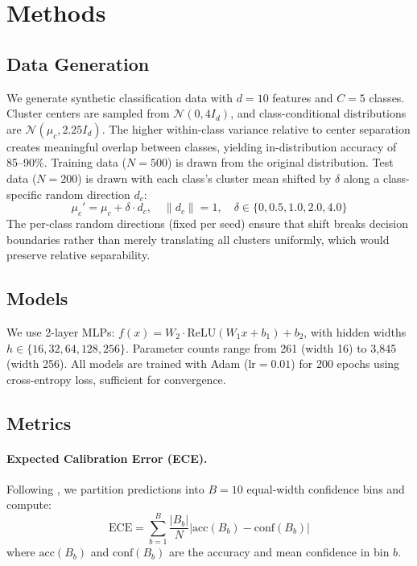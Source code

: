 \documentclass[11pt,a4paper]{article}
\begin{document}
\section{Methods}

\subsection{Data Generation}

We generate synthetic classification data with $d=10$ features and $C=5$ classes.
Cluster centers are sampled from $\mathcal{N}(0, 4I_d)$, and class-conditional distributions are $\mathcal{N}(\mu_c, 2.25 I_d)$.
The higher within-class variance relative to center separation creates meaningful overlap between classes, yielding in-distribution accuracy of 85--90\%.
Training data ($N=500$) is drawn from the original distribution.
Test data ($N=200$) is drawn with each class's cluster mean shifted by $\delta$ along a class-specific random direction $d_c$:
\begin{equation}
    \mu_c' = \mu_c + \delta \cdot d_c, \quad \|d_c\| = 1, \quad \delta \in \{0, 0.5, 1.0, 2.0, 4.0\}
\end{equation}
The per-class random directions (fixed per seed) ensure that shift breaks decision boundaries rather than merely translating all clusters uniformly, which would preserve relative separability.

\subsection{Models}

We use 2-layer MLPs: $f(x) = W_2 \cdot \text{ReLU}(W_1 x + b_1) + b_2$, with hidden widths $h \in \{16, 32, 64, 128, 256\}$.
Parameter counts range from 261 (width 16) to 3,845 (width 256).
All models are trained with Adam ($\text{lr}=0.01$) for 200 epochs using cross-entropy loss, sufficient for convergence.

\subsection{Metrics}

\paragraph{Expected Calibration Error (ECE).}
Following \citet{guo2017calibration}, we partition predictions into $B=10$ equal-width confidence bins and compute:
\begin{equation}
    \text{ECE} = \sum_{b=1}^{B} \frac{|B_b|}{N} \left| \text{acc}(B_b) - \text{conf}(B_b) \right|
\end{equation}
where $\text{acc}(B_b)$ and $\text{conf}(B_b)$ are the accuracy and mean confidence in bin $b$.
\end{document}
